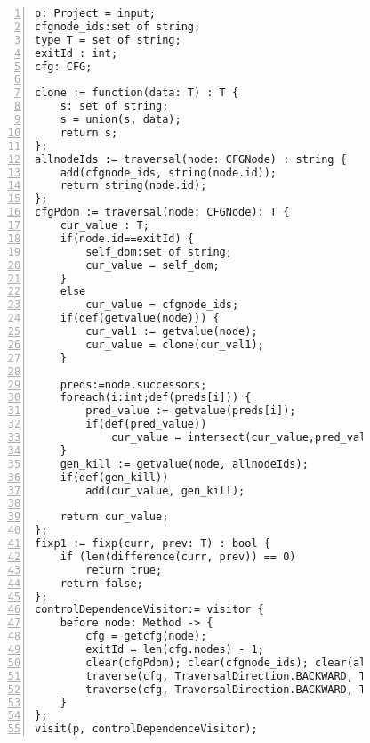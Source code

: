 \begin{figure}
\begin{lstlisting}[numbers=left, tabsize=4, escapechar=@, caption={Code to compute post dominator using Boa language.},label={lst:puttingTogether},lastline=55] 
p: Project = input;
cfgnode_ids:set of string;                     
type T = set of string; 
exitId : int;
cfg: CFG;  

clone := function(data: T) : T {
	s: set of string;
	s = union(s, data);
	return s;
};
allnodeIds := traversal(node: CFGNode) : string {
	add(cfgnode_ids, string(node.id));
	return string(node.id);
};
cfgPdom := traversal(node: CFGNode): T {
	cur_value : T;
	if(node.id==exitId) {
		self_dom:set of string;
		cur_value = self_dom;
	}
	else
		cur_value = cfgnode_ids;
	if(def(getvalue(node))) {
		cur_val1 := getvalue(node);
		cur_value = clone(cur_val1);
	}

	preds:=node.successors;
	foreach(i:int;def(preds[i])) {
		pred_value := getvalue(preds[i]);
		if(def(pred_value))
			cur_value = intersect(cur_value,pred_value);
	}	
	gen_kill := getvalue(node, allnodeIds);
	if(def(gen_kill))
        add(cur_value, gen_kill);
		
	return cur_value;
};
fixp1 := fixp(curr, prev: T) : bool {
 	if (len(difference(curr, prev)) == 0)
 		return true;	
 	return false;
};
controlDependenceVisitor:= visitor {
	before node: Method -> {
		cfg = getcfg(node);
		exitId = len(cfg.nodes) - 1;
		clear(cfgPdom);	clear(cfgnode_ids); clear(allnodeIds);
		traverse(cfg, TraversalDirection.BACKWARD, TraversalKind.Hybrid, allnodeIds);
		traverse(cfg, TraversalDirection.BACKWARD, TraversalKind.Hybrid, cfgPdom, fixp1);		    
	}
};
visit(p, controlDependenceVisitor);
\end{lstlisting}
\end{figure}